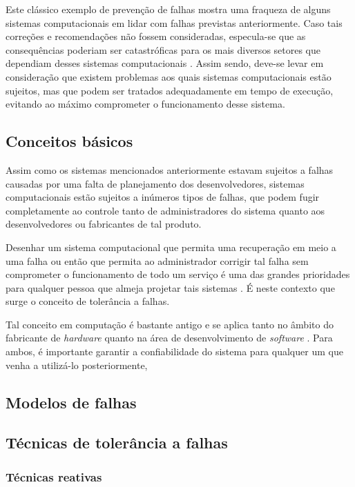\documentclass[
	12pt,				%
	openright,			%
	twoside,			%
	a4paper,			%
	english,			%
	french,				%
	spanish,			%
	brazil				%
	]{abntex2}
\begin{document}
Este clássico exemplo de prevenção de falhas mostra uma fraqueza de alguns sistemas computacionais em lidar com falhas previstas anteriormente. Caso tais correções e recomendações não fossem consideradas, especula-se que as consequências poderiam ser catastróficas para os mais diversos setores que dependiam desses sistemas computacionais \cite{smith1997year}. Assim sendo, deve-se levar em consideração que existem problemas aos quais sistemas computacionais estão sujeitos, mas que podem ser tratados adequadamente em tempo de execução, evitando ao máximo comprometer o funcionamento desse sistema. 

\subsection{Conceitos básicos}

Assim como os sistemas mencionados anteriormente estavam sujeitos a falhas causadas por uma falta de planejamento dos desenvolvedores, sistemas computacionais estão sujeitos a inúmeros tipos de falhas, que podem fugir completamente ao controle tanto de administradores do sistema quanto aos desenvolvedores ou fabricantes de tal produto.

Desenhar um sistema computacional que permita uma recuperação em meio a uma falha ou então que permita ao administrador corrigir tal falha sem comprometer o funcionamento de todo um serviço é uma das grandes prioridades para qualquer pessoa que almeja projetar tais sistemas \cite{bala2012fault}. É neste contexto que surge o conceito de tolerância a falhas.

Tal conceito em computação é bastante antigo e se aplica tanto no âmbito do fabricante de \emph{hardware} quanto na área de desenvolvimento de \emph{software} \cite{randell1975system}. Para ambos, é importante garantir a confiabilidade do sistema para qualquer um que venha a utilizá-lo posteriormente, 


\subsection{Modelos de falhas}



\subsection{Técnicas de tolerância a falhas}



\subsubsection{Técnicas reativas}
\end{document}

